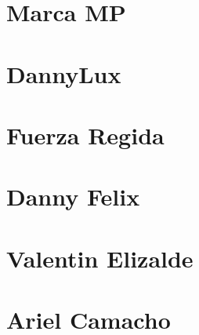 \documentclass{article}
\begin{document}
\section{Marca MP}


\section{DannyLux}


\section{Fuerza Regida}



\section{Danny Felix}

\section{Valentin Elizalde}


\section{Ariel Camacho}



\end{document}
